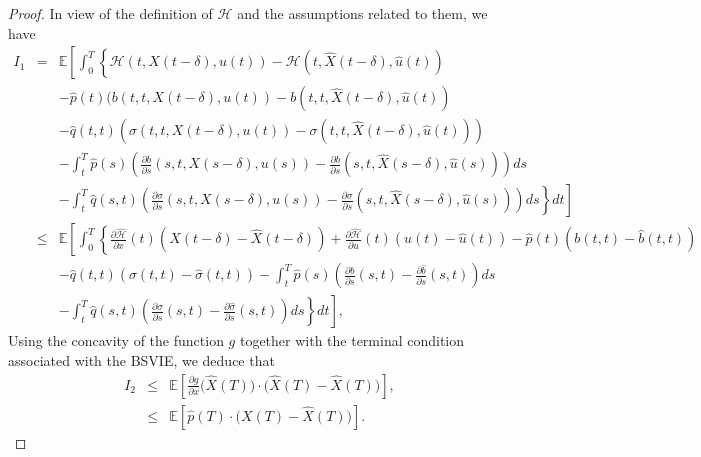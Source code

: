 \documentclass[12pt]{article}
\theoremstyle{remark}
\numberwithin{equation}{section}
\begin{document}
\begin{proof}
In view of the definition of $\mathcal{H}$ and the assumptions related to them, we have
\begin{eqnarray}\label{I1}
I_1 &=& \mathbb{E} \left[\int_0^T \left\{ \mathcal{H}(t, X(t-\delta), u(t))  - \mathcal{H}(t,\hat{X}(t-\delta), \hat{u}(t))\right.\right.\nonumber\\
&&\left.\left.- \hat{p}(t)(b(t,t, X(t-\delta),  u(t)) - b(t,t, \hat{X}(t-\delta), \hat{u}(t))\right.\right.\nonumber\\
&&\left.\left. - \hat{q}(t,t)(\sigma(t,t, X(t-\delta), u(t)) - \sigma(t,t, \hat{X}(t-\delta), \hat{u}(t)))\right.\right.\nonumber\\
&& \left.\left.- \int_{t}^{T}\hat{p}(s)\left( \frac{\partial b}{\partial s}(s,t,X(s-\delta),u(s)) - \frac{\partial b}{\partial s}(s,t,\hat{X}(s-\delta),\hat{u}(s))\right)ds\right.\right.\nonumber \\
&& \left.\left.- \int_{t}^{T}\hat{q}(s,t)\left( \frac{\partial \sigma}{\partial s}(s,t,X(s-\delta),u(s)) - \frac{\partial \sigma}{\partial s}(s,t,\hat{X}(s-\delta),\hat{u}(s))\right)ds\right\} dt \right]	\nonumber\\
&\leq & \mathbb{E}\left[\int_0^T \left\{\frac{\partial \hat{\mathcal{H}}}{\partial x}(t) (X(t-\delta) - \hat{X}(t-\delta))+\frac{\partial \hat{\mathcal{H}}}{\partial u}(t) (u(t) - \hat{u}(t))- \hat{p}(t)(b(t,t) - \hat{b}(t,t))\nonumber\right.\right. \nonumber\\
&&\left.\left.- \hat{q}(t,t)( \sigma(t,t) - \hat{\sigma}(t,t))- \int_{t}^{T}\hat{p}(s)(\frac{\partial b}{\partial s}(s,t)- \frac{\partial \hat{b}}{\partial s}(s,t)) ds \nonumber\right.\right.\nonumber \\
&&\left.\left. - \int_{t}^{T}\hat{q}(s,t)\left( \frac{\partial \sigma}{\partial s}(s,t)- \frac{\partial \hat{\sigma}}{\partial s}(s,t)\right)ds\right\}dt\right], 
\end{eqnarray}
Using the concavity of the function $g$ together with the terminal condition associated with the BSVIE, we deduce that
\begin{eqnarray*}
I_2 &\leq & \mathbb{E} \left[ \frac{\partial g}{\partial x}\big(\hat{X}(T)\big) \cdot \big(\hat{X}(T) - \hat{X}(T)\big) \right], \\
	&\leq &\mathbb{E} \left[ \hat{p}(T) \cdot \big(X(T) - \hat{X}(T)\big) \right].	
\end{eqnarray*}


\end{proof}
\end{document}
